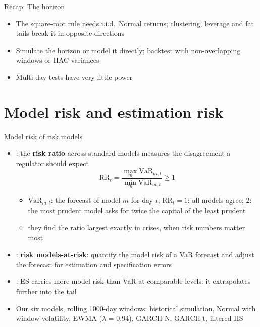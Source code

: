 \begin{frame}{Recap: The horizon}
\itemsize{\small}
\begin{itemize}
    \item The square-root rule needs i.i.d.\ Normal returns; clustering, leverage and fat tails break it in opposite directions
    \item Simulate the horizon or model it directly; backtest with non-overlapping windows or HAC variances
    \item Multi-day tests have very little power
\end{itemize}
\end{frame}


\section{Model risk and estimation risk}

\begin{frame}{Model risk of risk models}
\itemsize{\small}
\begin{itemize}
    \item {}: the \textbf{risk ratio} across standard models measures the disagreement a regulator should expect
    \[ \mathrm{RR}_t = \frac{\max_m\mathrm{VaR}_{m,t}}{\min_m\mathrm{VaR}_{m,t}} \ge 1 \]
    \begin{itemize}
        \item $\mathrm{VaR}_{m,t}$: the forecast of model $m$ for day $t$; $\mathrm{RR}_t = 1$: all models agree; 2: the most prudent model asks for twice the capital of the least prudent
        \item they find the ratio largest exactly in crises, when risk numbers matter most
    \end{itemize}
    \item {}: \textbf{risk models-at-risk}: quantify the model risk of a VaR forecast and adjust the forecast for estimation and specification errors
    \item {}: ES carries more model risk than VaR at comparable levels: it extrapolates further into the tail
    \item Our six models, rolling 1000-day windows: historical simulation, Normal with window volatility, EWMA ($\lambda$ = 0.94), GARCH-N, GARCH-t, filtered HS
\end{itemize}
\end{frame}

